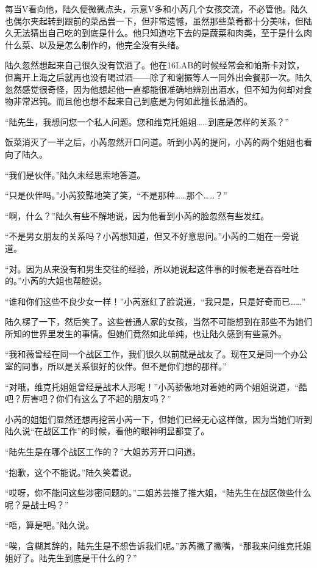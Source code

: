 每当V看向他，陆久便微微点头，示意V多和小芮几个女孩交流，不必管他。陆久也偶尔夹起转到跟前的菜品尝一下，但非常遗憾，虽然那些菜肴都十分美味，但陆久无法猜出自己吃的到底是什么。他只知道吃下去的是蔬菜和肉类，至于是什么肉什么菜、以及是怎么制作的，他完全没有头绪。

陆久忽然想起来自己很久没有饮酒了。他在16LAB的时候经常会和帕斯卡对饮，但离开上海之后就再也没有喝过酒——除了和谢振等人一同外出会餐那一次。陆久忽然感觉很奇怪，因为他想起他一直都能很准确地辨别出酒水，但不知为何却对食物非常迟钝。而且他也想不起来自己到底是为何如此擅长品酒的。

“陆先生，我想问您一个私人问题。您和维克托姐姐……到底是怎样的关系？”

饭菜消灭了一半之后，小芮忽然开口问道。听到小芮的提问，小芮的两个姐姐也看向了陆久。

“我们是伙伴。”陆久未经思索地答道。

“只是伙伴吗。”小芮狡黠地笑了笑，“不是那种……那个……？”

“啊，什么？”陆久有些不解地说，因为他看到小芮的脸忽然有些发红。

“不是男女朋友的关系吗？小芮想知道，但又不好意思问。”小芮的二姐在一旁说道。

“对。因为从来没有和男生交往的经验，所以她说起这件事的时候老是吞吞吐吐的。”小芮的大姐也帮腔说。

“谁和你们这些不良少女一样！”小芮涨红了脸说道，“我只是，只是好奇而已……”

陆久楞了一下，然后笑了。这些普通人家的女孩，当然不可能想到在那些不为她们所知的世界里发生的事情。但她们竟然如此单纯，也让陆久感到有些意外。

“我和薇曾经在同一个战区工作，我们很久以前就是战友了。现在又是同一个办公室的同事，所以是关系很好的伙伴。但不是你们想的那样。”

“对哦，维克托姐姐曾经是战术人形呢！”小芮骄傲地对着她的两个姐姐说道，“酷吧？厉害吧？你们有这么了不起的朋友吗？”

小芮的姐姐们显然还想再挖苦小芮一下，但她们已经无心这样做，因为当她们听到陆久说“在战区工作”的时候，看他的眼神明显都变了。

“陆先生是在哪个战区工作的？”大姐苏芳开口问道。

“抱歉，这个不能说。”陆久笑着说。

“哎呀，你不能问这些涉密问题的。”二姐苏芸推了推大姐，“陆先生在战区做些什么呢？是战士吗？”

“唔，算是吧。”陆久说。

“唉，含糊其辞的，陆先生是不想告诉我们呢。”苏芮撇了撇嘴，“那我来问维克托姐姐好了。陆先生到底是干什么的？”

